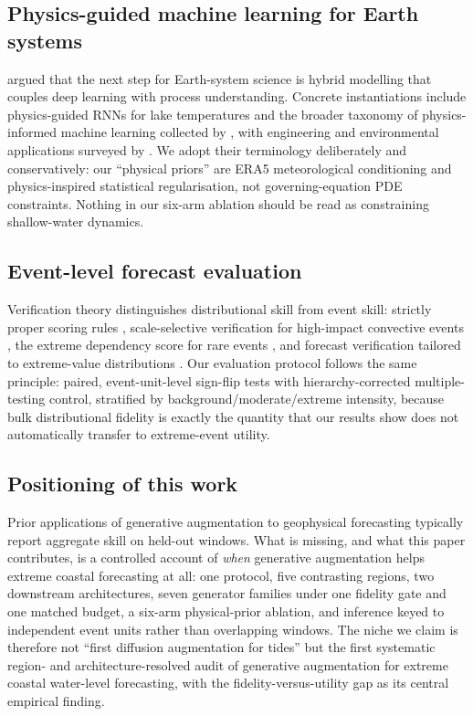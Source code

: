 \subsection{Physics-guided machine learning for Earth systems}
\citet{reichstein2019deep} argued that the next step for Earth-system science
is hybrid modelling that couples deep learning with process understanding.
Concrete instantiations include physics-guided RNNs for lake temperatures
\citep{jia2019physics} and the broader taxonomy of physics-informed machine
learning collected by \citet{karniadakis2021physics}, with engineering and
environmental applications surveyed by \citet{willard2022integrating}. We
adopt their terminology deliberately and conservatively: our ``physical
priors'' are ERA5 meteorological conditioning and physics-inspired
statistical regularisation, not governing-equation PDE constraints. Nothing
in our six-arm ablation should be read as constraining shallow-water
dynamics.

\subsection{Event-level forecast evaluation}
Verification theory distinguishes distributional skill from event skill:
strictly proper scoring rules \citep{gneiting2007strictly}, scale-selective
verification for high-impact convective events \citep{roberts2008scale}, the
extreme dependency score for rare events \citep{stephenson2008extreme}, and
forecast verification tailored to extreme-value distributions
\citep{friederichs2012forecast}. Our evaluation protocol follows the same
principle: paired, event-unit-level sign-flip tests with hierarchy-corrected
multiple-testing control, stratified by background/moderate/extreme intensity,
because bulk distributional fidelity is exactly the quantity that our results
show does not automatically transfer to extreme-event utility.

\subsection{Positioning of this work}
Prior applications of generative augmentation to geophysical forecasting
typically report aggregate skill on held-out windows. What is missing, and
what this paper contributes, is a controlled account of \emph{when}
generative augmentation helps extreme coastal forecasting at all: one
protocol, five contrasting regions, two downstream architectures, seven
generator families under one fidelity gate and one matched budget, a
six-arm physical-prior ablation, and inference keyed to independent event
units rather than overlapping windows. The niche we claim is therefore not
``first diffusion augmentation for tides'' but the first systematic
region- and architecture-resolved audit of generative augmentation for
extreme coastal water-level forecasting, with the fidelity-versus-utility
gap as its central empirical finding.
